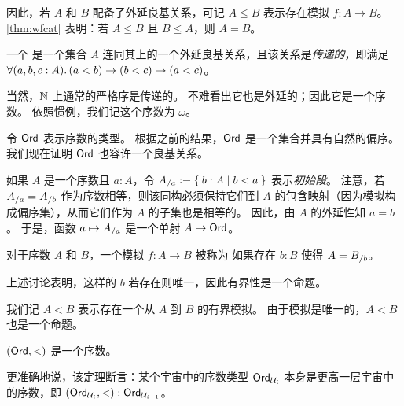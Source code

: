 因此，若 $A$ 和 $B$ 配备了外延良基关系，可记 $A\le B$ 表示存在模拟 $f:A\to B$。
\cref{thm:wfcat} 表明：若 $A\le B$ 且 $B\le A$，则 $A=B$。

\begin{defn}
  一个
  是一个集合 $A$ 连同其上的一个外延良基关系，且该关系是\emph{传递的}，即满足 $\fall{a,b,c:A}(a<b)\to (b<c) \to (a<c)$。
\end{defn}

\begin{eg}
  当然，$\mathbb{N}$ 上通常的严格序是传递的。
  不难看出它也是外延的；因此它是一个序数。
  依照惯例，我们记这个序数为 $\omega$。
\end{eg}

令 $\mathsf{Ord}$ 表示序数的类型。
根据之前的结果，$\mathsf{Ord}$ 是一个集合并具有自然的偏序。
我们现在证明 $\mathsf{Ord}$ 也容许一个良基关系。

如果 $A$ 是一个序数且 $a:A$，令 ${A}_{/a} \vcentcolon\equiv \Set{ b:A | b<a}$ 表示\emph{初始段}。
%
注意，若 ${A}_{/a} = {A}_{/b}$ 作为序数相等，则该同构必须保持它们到 $A$ 的包含映射（因为模拟构成偏序集），从而它们作为 $A$ 的子集也是相等的。
因此，由 $A$ 的外延性知 $a=b$。
于是，函数 $a\mapsto {A}_{/a}$ 是一个单射 $A\to \mathsf{Ord}$。

\begin{defn}
  对于序数 $A$ 和 $B$，一个模拟 $f:A\to B$ 被称为
  如果存在 $b:B$ 使得 $A = {B}_{/b}$。
\end{defn}

上述讨论表明，这样的 $b$ 若存在则唯一，因此有界性是一个命题。

我们记 $A<B$ 表示存在一个从 $A$ 到 $B$ 的有界模拟。
由于模拟是唯一的，$A<B$ 也是一个命题。

\begin{thm}\label{thm:ordord}
  $(\mathsf{Ord},<)$ 是一个序数。
\end{thm}

\noindent
更准确地说，该定理断言：某个宇宙中的序数类型 $\mathsf{Ord}_{\mathcal{U}_i}$ 本身是更高一层宇宙中的序数，即 $(\mathsf{Ord}_{\mathcal{U}_i},<):\mathsf{Ord}_{\mathcal{U}_{i+1}}$。

